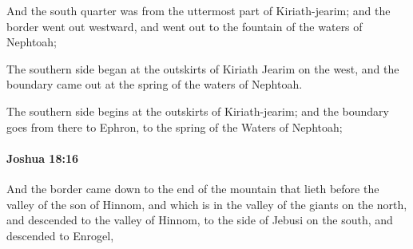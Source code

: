 			\begin{versebox}
					\item[BHS] 
					\item[ASV] And the south quarter was from the uttermost part of Kiriath-jearim; and the border went out westward, and went out to the fountain of the waters of Nephtoah;
					\item[NIV] The southern side began at the outskirts of Kiriath Jearim on the west, and the boundary came out at the spring of the waters of Nephtoah.
					\item[NRSV] The southern side begins at the outskirts of Kiriath-jearim; and the boundary goes from there to Ephron, to the spring of the Waters of Nephtoah;
			\end{versebox}

		\paragraph{Joshua 18:16} %
			\label{JOSHUA-18-16}

			And the border came down to the end of the mountain that lieth before the valley of the son of Hinnom, and which is in the valley of the giants on the north, and descended to the valley of Hinnom, to the side of Jebusi on the south, and descended to Enrogel,

